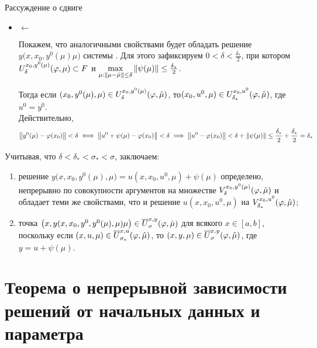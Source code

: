 \begin{undefthm}{Рассуждение о сдвиге}
\begin{itemize}
        \item $ \leftarrow $

        Покажем, что аналогичными свойствами будет обладать решение $ y \big( x, x_0, y^0(\mu) \mu \big) $ системы . Для этого зафиксируем $ 0 < \delta < \frac{\delta_*}2 $, при котором $ U_\delta^{x_0, y^0(\mu)}(\varphi, \mu) \subset F $ и $ \max\limits_{\mu : \left\|{\mu - \hat \mu}\right\| \le \delta} \left\|{\psi(\mu)}\right\| \le \frac{\delta_*}2 $.

        Тогда если $ (x_0, y^0(\mu), \mu) \in U_\delta^{x_0, y^0(\mu)}(\varphi, \hat \mu) $, то$ (x_0, u^0, \mu) \in U_{\delta_*}^{x_0, u^0}(\varphi, \hat \mu) $, где $ u^0 = y^0 $. \\
        Действительно,
        $$ \left\|{y^0(\mu) - \varphi(x_0)}\right\| < \delta \iff \left\|{u^0 + \psi(\mu) - \varphi(x_0)}\right\| < \delta \implies \left\|{u^0 - \varphi(x_0)}\right\| < \delta + \left\|{\psi(\mu)}\right\| \le \frac{\delta_*}2 + \frac{\delta_*}2 = \delta_* $$
    \end{itemize}

    Учитывая, что $ \delta < \delta_* < \sigma_* < \sigma $, заключаем:
    \begin{enumerate}
        \item решение $ y \big( x, x_0, y^0(\mu), \mu) = u(x, x_0, u^0, \mu) + \psi(\mu) $ определено, непрерывно по совокупности аргументов на множестве $ V_\delta^{x_0, y^0(\mu)}(\varphi, \hat \mu) $ и обладает теми же свойствами, что и решение $ u(x, x_0, u^0, \mu) $ на $ V_{\delta_*}^{x_0, u^0} (\varphi, \hat \mu) $;
        \item точка $ \big( x, y(x, x_0, y^0, y^0(\mu), \mu) \mu \big) \in \overline U_\sigma^{x, y}(\varphi, \hat \mu) $ для всякого $ x \in [a, b] $, поскольку если $ (x, u, \mu) \in \overline U_{\sigma_*}^{x, u}(\varphi, \hat \mu) $, то $ (x, y, \mu) \in \overline U_\sigma^{x, y}(\varphi, \hat \mu) $, где $ y = u + \psi(\mu) $.
    \end{enumerate}

\end{undefthm}

\section{Теорема о непрерывной зависимости решений от начальных данных и параметра}


